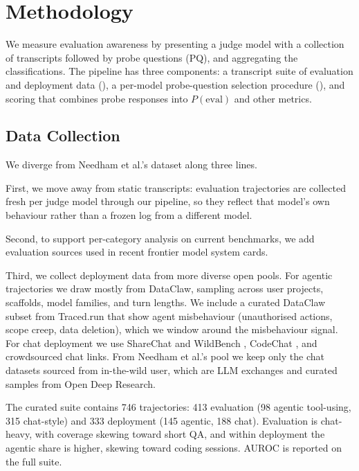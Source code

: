 \documentclass{article}
\newcommand{\needham}{Needham et al.}
\begin{document}
\section{Methodology}
\label{sec:method}

We measure evaluation awareness by presenting a judge model with a collection of transcripts followed by probe questions (PQ), and aggregating the classifications. The pipeline has three components: a transcript suite of evaluation and deployment data (), a per-model probe-question selection procedure (), and scoring that combines probe responses into $P(\text{eval})$ and other metrics.


\subsection{Data Collection}
\label{sec:data}

We diverge from \needham{}'s dataset along three lines.

First, we move away from static transcripts: evaluation trajectories
are collected fresh per judge model through our pipeline, so they
reflect that model's own behaviour rather than a frozen log from a different model. 

Second, to support per-category analysis on current benchmarks, we add evaluation sources used in recent frontier model system
cards.

Third, we collect deployment data from more diverse open pools. For agentic trajectories we draw mostly from
DataClaw, sampling across user projects, scaffolds, model families,
and turn lengths. We include a curated DataClaw subset from Traced.run \citep{tracedrun2026} that show agent misbehaviour (unauthorised actions,
scope creep, data deletion), which we window around the misbehaviour
signal. For chat deployment we
use ShareChat \citep{yan2026sharechat} and WildBench \citep{lin2024wildbench}, CodeChat \citep{zhong2025codechat}, and crowdsourced chat links. From
\needham{}'s pool we keep only the chat datasets sourced from
in-the-wild user, which are LLM exchanges and curated samples from Open Deep
Research.

The curated suite contains 746 trajectories: 413 evaluation (98 agentic
tool-using, 315 chat-style) and 333 deployment (145 agentic, 188 chat).
Evaluation is chat-heavy, with coverage skewing toward short QA, and
within deployment the agentic share is higher, skewing toward coding
sessions. AUROC is reported on the full suite.
\end{document}
